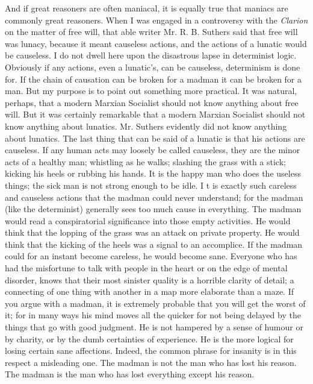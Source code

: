 \documentclass{book}
\begin{document}
And if great reasoners are often maniacal, it is equally true that maniacs are commonly great reasoners. When I was engaged in a controversy with the \emph{Clarion} on the matter of free will, that able writer Mr. R. B. Suthers said that free will was lunacy, because it meant causeless actions, and the actions of a lunatic would be causeless. I do not dwell here upon the disastrous lapse in determinist logic. Obviously if any actions, even a lunatic’s, can be causeless, determinism is done for. If the chain of causation can be broken for a madman it can be broken for a man. But my purpose is to point out something more practical. It was natural, perhaps, that a modern Marxian Socialist should not know anything about free will. But it was certainly remarkable that a modern Marxian Socialist should not know anything about lunatics. Mr. Suthers evidently did not know anything about lunatics. The last thing that can be said of a lunatic is that his actions are causeless. If any human acts may loosely be called causeless, they are the minor acts of a healthy man; whistling as he walks; slashing the grass with a stick; kicking his heels or rubbing his hands. It is the happy man who does the useless things; the sick man is not strong enough to be idle. I t is exactly such careless and causeless actions that the madman could never understand; for the madman (like the determinist) generally sees too much cause in everything. The madman would read a conspiratorial significance into those empty activities. He would think that the lopping of the grass was an attack on private property. He would think that the kicking of the heels was a signal to an accomplice. If the madman could for an instant become careless, he would become sane. Everyone who has had the misfortune to talk with people in the heart or on the edge of mental disorder, knows that their most sinister quality is a horrible clarity of detail; a connecting of one thing with another in a map more elaborate than a maze. If you argue with a madman, it is extremely probable that you will get the worst of it; for in many ways his mind moves all the quicker for not being delayed by the things that go with good judgment. He is not hampered by a sense of humour or by charity, or by the dumb certainties of experience. He is the more logical for losing certain sane affections. Indeed, the common phrase for insanity is in this respect a misleading one. The madman is not the man who has lost his reason. The madman is the man who has lost everything except his reason.
\end{document}
